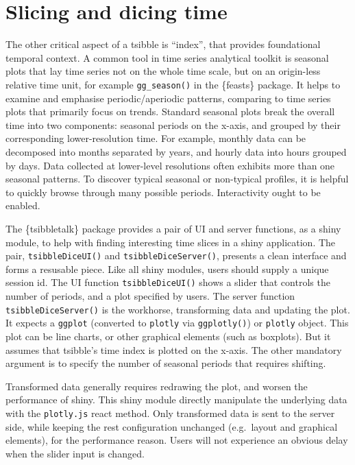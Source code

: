 \hypertarget{slicing-and-dicing-time}{%
\section{Slicing and dicing time}\label{slicing-and-dicing-time}}

The other critical aspect of a tsibble is ``index'', that provides
foundational temporal context. A common tool in time series analytical
toolkit is seasonal plots that lay time series not on the whole time
scale, but on an origin-less relative time unit, for example
\texttt{gg\_season()} in the \{feasts\} package. It helps to examine and
emphasise periodic/aperiodic patterns, comparing to time series plots
that primarily focus on trends. Standard seasonal plots break the
overall time into two components: seasonal periods on the x-axis, and
grouped by their corresponding lower-resolution time. For example,
monthly data can be decomposed into months separated by years, and
hourly data into hours grouped by days. Data collected at lower-level
resolutions often exhibits more than one seasonal patterns. To discover
typical seasonal or non-typical profiles, it is helpful to quickly
browse through many possible periods. Interactivity ought to be enabled.

The \{tsibbletalk\} package provides a pair of UI and server functions,
as a shiny module, to help with finding interesting time slices in a
shiny application. The pair, \texttt{tsibbleDiceUI()} and
\texttt{tsibbleDiceServer()}, presents a clean interface and forms a
resusable piece. Like all shiny modules, users should supply a unique
session id. The UI function \texttt{tsibbleDiceUI()} shows a slider that
controls the number of periods, and a plot specified by users. The
server function \texttt{tsibbleDiceServer()} is the workhorse,
transforming data and updating the plot. It expects a \texttt{ggplot}
(converted to \texttt{plotly} via \texttt{ggplotly()}) or
\texttt{plotly} object. This plot can be line charts, or other graphical
elements (such as boxplots). But it assumes that tsibble's time index is
plotted on the x-axis. The other mandatory argument is to specify the
number of seasonal periods that requires shifting.

Transformed data generally requires redrawing the plot, and worsen the
performance of shiny. This shiny module directly manipulate the
underlying data with the \texttt{plotly.js} react method. Only
transformed data is sent to the server side, while keeping the rest
configuration unchanged (e.g.~layout and graphical elements), for the
performance reason. Users will not experience an obvious delay when the
slider input is changed.

